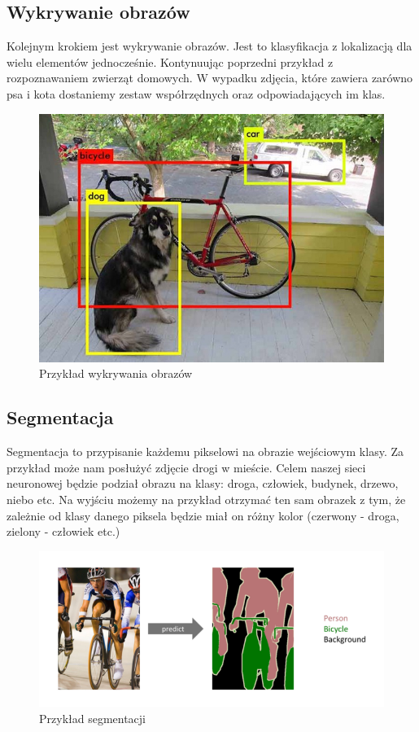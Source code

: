 \documentclass{article}
\begin{document}
\subsection{Wykrywanie obrazów}
Kolejnym krokiem jest wykrywanie obrazów. Jest to klasyfikacja z lokalizacją dla wielu elementów jednocześnie.
Kontynuując poprzedni przykład z rozpoznawaniem zwierząt domowych.
W wypadku zdjęcia, które zawiera zarówno psa i kota dostaniemy zestaw współrzędnych oraz odpowiadających im klas.
\begin{figure}[H]
  \centering
  \includegraphics[width=\linewidth]{images/detekcja.jpeg}
  \caption{Przykład wykrywania obrazów}
  \label{fig:wykrywanie_obrazow}
\end{figure}
\subsection{Segmentacja}
Segmentacja to przypisanie każdemu pikselowi na obrazie wejściowym klasy.
Za przykład może nam posłużyć zdjęcie drogi w mieście.
Celem naszej sieci neuronowej będzie podział obrazu na klasy: droga, człowiek, budynek, drzewo, niebo etc.
Na wyjściu możemy na przykład otrzymać ten sam obrazek z tym, że zależnie od klasy danego piksela będzie miał on różny kolor (czerwony - droga, zielony - człowiek etc.)
\begin{figure}[H]
  \centering
  \includegraphics[width=\linewidth]{images/segmentacja.png}
  \caption{Przykład segmentacji}
  \label{fig:segmentacja}
\end{figure}
\end{document}

